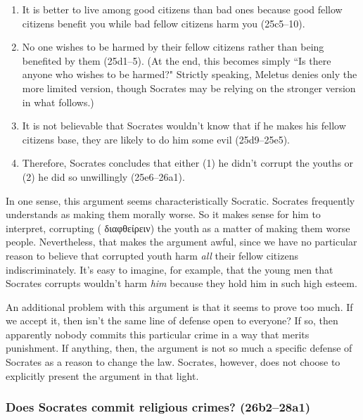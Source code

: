 \documentclass[11pt]{article}
\begin{document}
\begin{enumerate}
    \item It is better to live among good citizens than bad ones because
        good fellow citizens benefit you while bad fellow citizens harm you
        (25c5--10).

    \item No one wishes to be harmed by their fellow citizens rather than
        being benefited by them (25d1--5). (At the end, this becomes simply
        ``Is there anyone who wishes to be harmed?" Strictly speaking,
        Meletus denies only the more limited version, though Socrates may
        be relying on the stronger version in what follows.)

    \item It is not believable that Socrates wouldn't know that if he makes
        his fellow citizens base, they are likely to do him some evil
        (25d9--25e5).

    \item Therefore, Socrates concludes that either (1) he didn't corrupt
        the youths or (2) he did so unwillingly (25e6--26a1).
\end{enumerate}

In one sense, this argument seems characteristically Socratic.  Socrates
frequently understands  as making them morally
worse.  So it makes sense for him to interpret, corrupting ({\g
διαφθείρειν}) the youth as a matter of making them worse people.
Nevertheless, that makes the argument awful, since we have no particular
reason to believe that corrupted youth harm \emph{all} their fellow
citizens indiscriminately.  It's easy to imagine, for example, that the
young men that Socrates corrupts wouldn't harm \emph{him} because they hold
him in such high esteem.

An additional problem with this argument is that it seems to prove too
much.  If we accept it, then isn't the same line of defense open to
everyone?  If so, then apparently nobody commits this particular crime in
a way that merits punishment.  If anything, then, the argument is not so
much a specific defense of Socrates as a reason to change the law.
Socrates, however, does not choose to explicitly present the argument in
that light.


\subsubsection{Does Socrates commit religious crimes? (26b2--28a1)}
\end{document}
